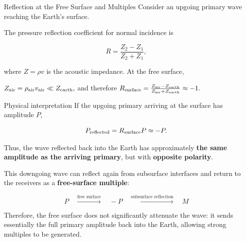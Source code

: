 \documentclass{beamer}
\begin{document}
\begin{frame}{Reflection at the Free Surface and Multiples}
\scriptsize
Consider an upgoing primary wave reaching the Earth's surface.

The pressure reflection coefficient for normal incidence is

\[
R=\frac{Z_2-Z_1}{Z_2+Z_1},
\]

where \(Z=\rho v\) is the acoustic impedance. At the free surface, 

$Z_{\rm air}=\rho_{\rm air}v_{\rm air}\ll Z_{\rm earth},$
and therefore $R_{\rm surface}=\frac{Z_{\rm air}-Z_{\rm earth}}{Z_{\rm air}+Z_{\rm earth}}\approx -1.$

\begin{block}{Physical interpretation}
If the upgoing primary arriving at the surface has amplitude \(P\),

\[
P_{\rm reflected}
=
R_{\rm surface}P
\approx -P.
\]

Thus, the wave reflected back into the Earth has approximately
\textbf{the same amplitude as the arriving primary}, but with
\textbf{opposite polarity}.
\end{block}

This downgoing wave can reflect again from subsurface interfaces and
return to the receivers as a \textbf{free-surface multiple}:

\[
\boxed{
P
\quad\xrightarrow{\text{free surface}}\quad
-P
\quad\xrightarrow{\text{subsurface reflection}}\quad
M
}
\]

Therefore, the free surface does not significantly attenuate the wave:
it sends essentially the full primary amplitude back into the Earth,
allowing strong multiples to be generated.

\end{frame}
\end{document}
